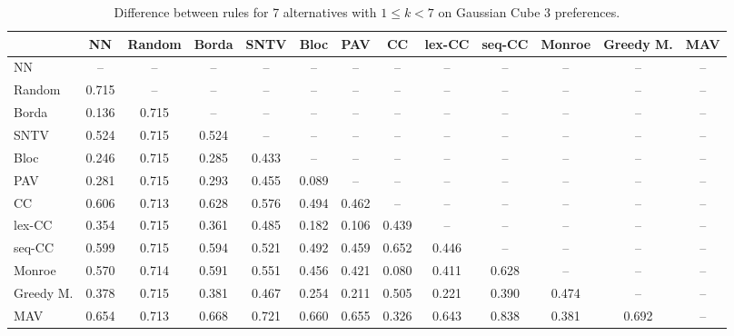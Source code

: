 
\begin{table*}[h!]
\centering
\begin{tabular}{lcccccccccccc}
\toprule
 & NN & Random & Borda & SNTV & Bloc & PAV & CC & lex-CC & seq-CC & Monroe & Greedy M. & MAV \\
\midrule
NN & -- & -- & -- & -- & -- & -- & -- & -- & -- & -- & -- & -- \\
Random & 0.715 & -- & -- & -- & -- & -- & -- & -- & -- & -- & -- & -- \\
Borda & 0.136 & 0.715 & -- & -- & -- & -- & -- & -- & -- & -- & -- & -- \\
SNTV & 0.524 & 0.715 & 0.524 & -- & -- & -- & -- & -- & -- & -- & -- & -- \\
Bloc & 0.246 & 0.715 & 0.285 & 0.433 & -- & -- & -- & -- & -- & -- & -- & -- \\
PAV & 0.281 & 0.715 & 0.293 & 0.455 & 0.089 & -- & -- & -- & -- & -- & -- & -- \\
CC & 0.606 & 0.713 & 0.628 & 0.576 & 0.494 & 0.462 & -- & -- & -- & -- & -- & -- \\
lex-CC & 0.354 & 0.715 & 0.361 & 0.485 & 0.182 & 0.106 & 0.439 & -- & -- & -- & -- & -- \\
seq-CC & 0.599 & 0.715 & 0.594 & 0.521 & 0.492 & 0.459 & 0.652 & 0.446 & -- & -- & -- & -- \\
Monroe & 0.570 & 0.714 & 0.591 & 0.551 & 0.456 & 0.421 & 0.080 & 0.411 & 0.628 & -- & -- & -- \\
Greedy M. & 0.378 & 0.715 & 0.381 & 0.467 & 0.254 & 0.211 & 0.505 & 0.221 & 0.390 & 0.474 & -- & -- \\
MAV & 0.654 & 0.713 & 0.668 & 0.721 & 0.660 & 0.655 & 0.326 & 0.643 & 0.838 & 0.381 & 0.692 & -- \\
\bottomrule
\end{tabular}

\caption{Difference between rules for 7 alternatives with $1 \leq k < 7$ on Gaussian Cube 3 preferences.}
\end{table*}
